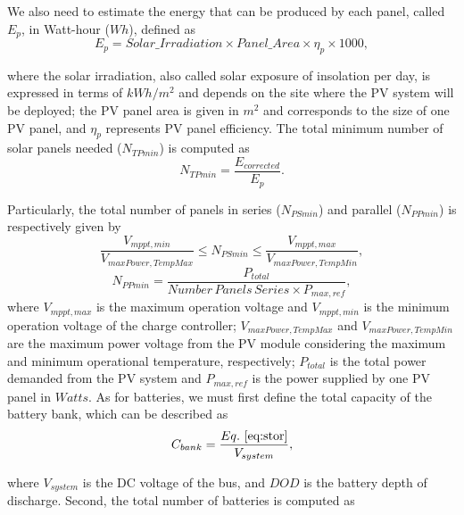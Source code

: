 We also need to estimate the energy that can be produced by each panel, called $E_{p}$, in Watt-hour ($Wh$), defined as
%
\begin{equation}
\label{eq:Ep}
E_{p} = Solar\_Irradiation \times Panel\_Area \times \eta_{p} \times 1000,
\end{equation}

\noindent where the solar irradiation, also called solar exposure of insolation per day, is expressed in terms of $kWh/m^{2}$ and depends on the site where the PV system will be deployed; 
the PV panel area is given in $m^{2}$ and corresponds to the size of one PV panel, and $\eta_{p}$ represents PV panel efficiency.
The total minimum number of solar panels needed ($N_{TPmin}$) is computed as
%
\begin{equation}
\label{eq:NTPmin}
N_{TPmin} = \dfrac{E_{corrected}}{E_{p}}.
\end{equation}

Particularly, the total number of panels in series ($N_{PSmin}$) and parallel ($N_{PPmin}$) is respectively given by
%
\begin{equation}
\label{eq:NPSmin}
\dfrac{V_{mppt,min}}{V_{maxPower,TempMax}} \leq N_{PSmin} \leq \dfrac{V_{mppt,max}}{V_{maxPower,TempMin}},
\end{equation}
%
\begin{equation}
\label{eq:NPPmin}
N_{PPmin} = \dfrac{P_{total}}{Number\,Panels\,Series \times P_{max,ref}},
\end{equation}
%
\noindent where $V_{mppt,max}$ is the maximum operation voltage and $V_{mppt,min}$ 
is the minimum operation voltage of the charge controller; $V_{maxPower,TempMax}$ and 
$V_{maxPower,TempMin}$ are the maximum power voltage from the PV module considering 
the maximum and minimum operational temperature, respectively; 
$P_{total}$ is the total power demanded from the PV system and 
$P_{max,ref}$ is the power supplied by one PV panel in $Watts$.
As for batteries, we must first define the total capacity of the battery bank, which can be described as
%
\begin{equation}
\label{eq:Cbank}
C_{bank} = \dfrac{Eq.~\eqref{eq:stor}}{V_{system}},
\end{equation}

\noindent where %
$ V_{system} $ is the DC voltage of the bus, and $ DOD $ is the battery depth of discharge.
%
Second, the total number of batteries is computed as 

